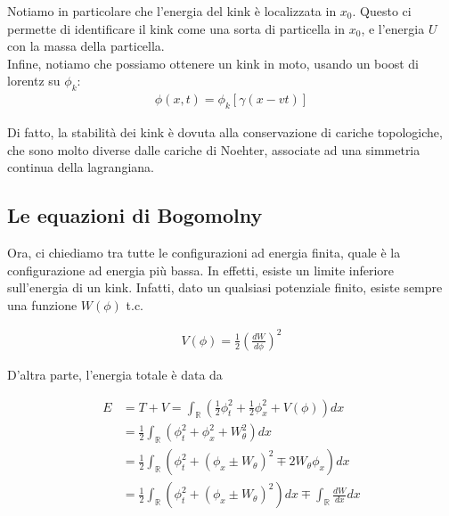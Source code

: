 \documentclass{report}
\begin{document}
{\begin{center}
    \end{center}

    Notiamo in particolare che l'energia del kink è localizzata in \(x_0\). Questo ci permette di identificare il kink come una sorta di particella in \(x_0\), e l'energia \(U\) con la massa della particella. \\

    Infine, notiamo che possiamo ottenere un kink in moto, usando un boost di lorentz su \(\phi_k\): 
    \begin{align}
        \phi(x, t) = \phi_k [\gamma(x-vt)]
    \end{align}
}

Di fatto, la stabilità dei kink è dovuta alla conservazione di cariche topologiche, che sono molto diverse dalle cariche di Noehter, associate ad una simmetria continua della lagrangiana. \\

\subsection{Le equazioni di Bogomolny}

Ora, ci chiediamo tra tutte le configurazioni ad energia finita, quale è la configurazione ad energia più bassa. In effetti, esiste un limite inferiore sull'energia di un kink. Infatti, dato un qualsiasi potenziale finito, esiste sempre una funzione \(W(\phi)\) t.c. 

\begin{align}
    V(\phi) = \frac{1}{2}\left(\frac{dW}{d\phi}\right)^2
\end{align}

D'altra parte, l'energia totale è data da 

\begin{align}
    E &= T + V = \int_{\mathbb{R}}\left(\frac{1}{2}\phi_t^2 + \frac{1}{2}\phi_x^2 + V(\phi)\right)dx \\
    &= \frac{1}{2}\int_\mathbb{R}\left(\phi_t^2 + \phi_x^2 + W_\theta^2\right)dx \\
    &= \frac{1}{2}\int_\mathbb{R}\left(\phi_t^2 + (\phi_x \pm W_\theta)^2 \mp 2W_\theta \phi_x\right)dx \\
    &= \frac{1}{2}\int_\mathbb{R}\left(\phi_t^2 + (\phi_x \pm W_\theta)^2\right) dx \mp \int_{\mathbb{R}} \frac{dW}{dx} dx
\end{align}
\end{document}
